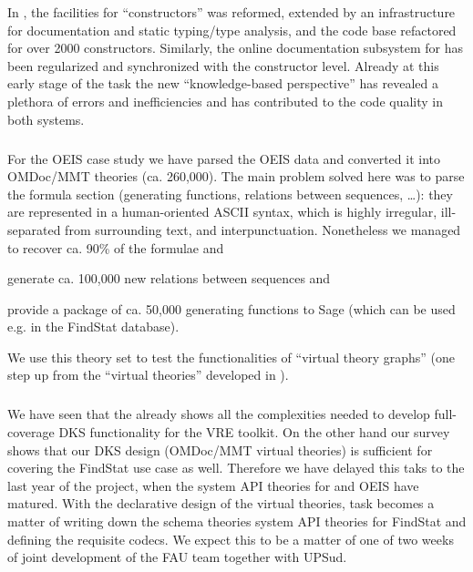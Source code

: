 In \GAP, the facilities for ``constructors'' was reformed, extended by an infrastructure for documentation and static typing/type analysis, and the code base refactored for over 2000 constructors.
Similarly, the online documentation subsystem for \GAP has been regularized and synchronized with the constructor level.
Already at this early stage of the task the new ``knowledge-based perspective'' has revealed a plethora of errors and inefficiencies and has contributed to the code quality in both systems.
\medskip

\subparagraph{}

For the OEIS case study we have parsed the OEIS data and converted it into OMDoc/MMT theories (ca. 260,000).
The main problem solved here was to parse the formula section (generating functions, relations between sequences, \ldots): they are represented in a human-oriented ASCII syntax, which is highly irregular, ill-separated from surrounding text, and interpunctuation.
Nonetheless we managed to recover ca. 90\% of the formulae and
\begin{compactenum}[\em i\rm)]
\item generate ca. 100,000 new relations between sequences and
\item provide a package of ca. 50,000 generating functions to Sage (which can be used
  e.g. in the FindStat database).
\end{compactenum}
We use this theory set to test the functionalities of ``virtual theory graphs'' (one step up from the ``virtual theories'' developed in ).
\medskip

\subparagraph{}
We have seen that the \LMFDB already shows all the complexities needed to develop full-coverage DKS functionality for the \pn VRE toolkit.
On the other hand our survey shows that our DKS design (OMDoc/MMT virtual theories) is sufficient for covering the FindStat use case as well.
Therefore we have delayed this taks to the last year of the \pn project, when the system API theories for \Sage and OEIS have matured. With the declarative design of the virtual theories, task  becomes a matter of writing down the schema theories system API theories for FindStat and defining the requisite codecs. We expect this to be a matter of one of two weeks of joint development of the FAU team together with UPSud. 
\medskip

\subparagraph{}

